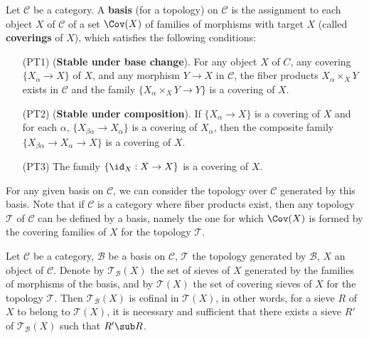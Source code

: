 \begin{definition}
Let $\mathcal{C}$ be a category. A \textbf{basis} (for a topology) on $\mathcal{C}$ is the assignment to each object $X$ of $\mathcal{C}$ of a set $\Cov(X)$ of families of morphisms with target $X$ (called \textbf{coverings} of $X$), which satisfies the following conditions:
\begin{enumerate}[leftmargin=40pt]
\item[(PT1)] (\textbf{Stable under base change}). For any object $X$ of $C$, any covering $\{X_\alpha\to X\}$ of $X$, and any morphism $Y\to X$ in $\mathcal{C}$, the fiber products $X_\alpha\times_XY$ exists in $\mathcal{C}$ and the family $\{X_\alpha\times_XY\to Y\}$ is a covering of $X$.
\item[(PT2)] (\textbf{Stable under composition}). If $\{X_\alpha\to X\}$ is a covering of $X$ and for each $\alpha$, $\{X_{\beta\alpha}\to X_\alpha\}$ is a covering of $X_\alpha$, then the composite family $\{X_{\beta\alpha}\to X_\alpha\to X\}$ is a covering of $X$.
\item[(PT3)] The family $\{\id_X:X\to X\}$ is a covering of $X$.
\end{enumerate}
\end{definition}
For any given basis on $\mathcal{C}$, we can consider the topology over $\mathcal{C}$ generated by this basis. Note that if $\mathcal{C}$ is a category where fiber products exist, then any topology $\mathcal{T}$ of $\mathcal{C}$ can be defined by a basis, namely the one for which $\Cov(X)$ is formed by the covering families of $X$ for the topology $\mathcal{T}$.
\begin{proposition}\label{G-topo generated by basis sieve char}
Let $\mathcal{C}$ be a category, $\mathcal{B}$ be a basis on $\mathcal{C}$, $\mathcal{T}$ the topology generated by $\mathcal{B}$, $X$ an object of $\mathcal{C}$. Denote by $\mathcal{T}_{\mathcal{B}}(X)$ the set of sieves of $X$ generated by the families of morphisms of the basis, and by $\mathcal{T}(X)$ the set of covering sieves of $X$ for the topology $\mathcal{T}$. Then $\mathcal{T}_{\mathcal{B}}(X)$ is cofinal in $\mathcal{T}(X)$, in other words, for a sieve $R$ of $X$ to belong to $\mathcal{T}(X)$, it is necessary and sufficient that there exists a sieve $R'$ of $\mathcal{T}_\mathcal{B}(X)$ such that $R'\sub R$. 
\end{proposition}
